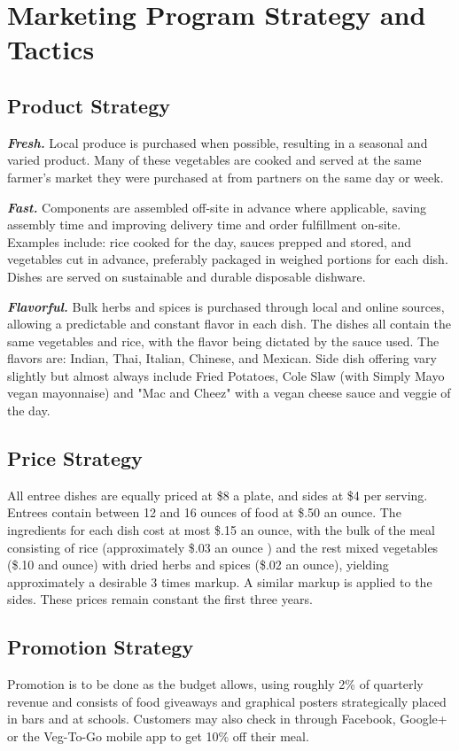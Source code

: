 \documentclass[12pt, letterpaper]{article}
\begin{document}
\newpage

\section{Marketing Program Strategy and Tactics}
\subsection{Product Strategy}
\textbf{\emph{Fresh.}} Local produce is purchased when possible, resulting in a seasonal and varied product. Many of these vegetables are cooked and served at the same farmer's market they were purchased at from partners on the same day or week.

\textbf{\emph{Fast.}} Components are assembled off-site in advance where applicable, saving assembly time and improving delivery time and order fulfillment on-site. Examples include: rice cooked for the day, sauces prepped and stored, and vegetables cut in advance, preferably packaged in weighed portions for each dish. Dishes are served on sustainable and durable disposable dishware.

\textbf{\emph{Flavorful.}} Bulk herbs and spices is purchased through local and online sources, allowing a predictable and constant flavor in each dish.  The dishes  all contain the same vegetables and rice, with the flavor being dictated by the sauce used.  The flavors are: Indian, Thai, Italian, Chinese, and Mexican. Side dish offering vary slightly but almost always include Fried Potatoes, Cole Slaw (with Simply Mayo\textregistered{} vegan mayonnaise) and "Mac and Cheez" with a vegan cheese sauce and veggie of the day.
\subsection{Price Strategy}
All entree dishes are equally priced at \$8 a plate, and sides at \$4 per serving. Entrees contain between 12 and 16 ounces of food at \$.50 an ounce. The ingredients for each dish cost at most \$.15 an ounce, with the bulk of the meal consisting of rice (approximately \$.03 an ounce \cite{costs}) and the rest mixed vegetables (\$.10 and ounce) with dried herbs and spices (\$.02 an ounce), yielding approximately a desirable 3 times markup. A similar markup is applied to the sides.  These prices remain constant the first three years.
\subsection{Promotion Strategy}
Promotion is to be done as the budget allows, using roughly 2\% of quarterly revenue and consists of food giveaways and graphical posters strategically placed in bars and at schools.  Customers may also check in through Facebook, Google+ or the Veg-To-Go mobile app to get 10\% off their meal.
\end{document}
